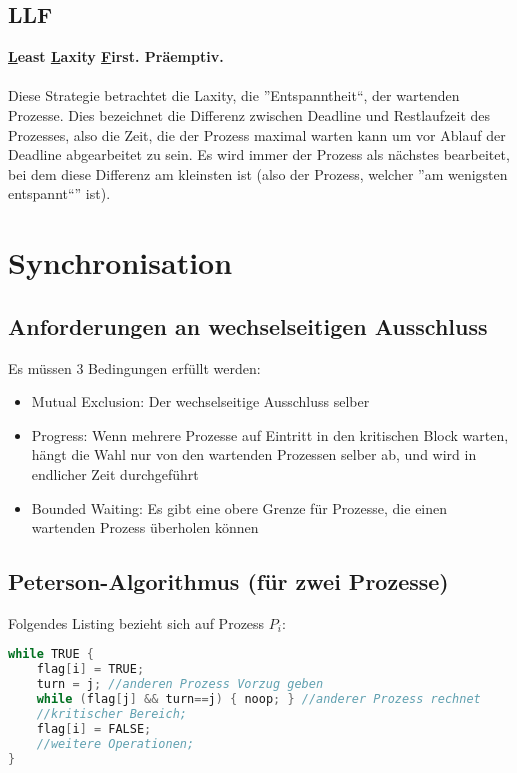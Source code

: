 \documentclass[11pt]{scrartcl}
\begin{document}
\subsection{LLF}
\textbf{\underline Least \underline Laxity \underline First. Präemptiv.}\\
\\
Diese Strategie betrachtet die Laxity, die ''Entspanntheit``, der wartenden Prozesse. Dies bezeichnet die Differenz zwischen Deadline und Restlaufzeit des Prozesses, also die Zeit, die der Prozess maximal warten kann um vor Ablauf der Deadline abgearbeitet zu sein. Es wird immer der Prozess als nächstes bearbeitet, bei dem diese Differenz am kleinsten ist (also der Prozess, welcher ''am wenigsten entspannt``'' ist).

\section{Synchronisation}
\subsection{Anforderungen an wechselseitigen Ausschluss}
Es müssen 3 Bedingungen erfüllt werden:

\begin{itemize}
\item{Mutual Exclusion: Der wechselseitige Ausschluss selber}
\item{Progress: Wenn mehrere Prozesse auf Eintritt in den kritischen Block warten, hängt die Wahl nur von den wartenden Prozessen selber ab, und wird in endlicher Zeit durchgeführt}
\item{Bounded Waiting: Es gibt eine obere Grenze für Prozesse, die einen wartenden Prozess überholen können}
\end{itemize}

\subsection{Peterson-Algorithmus (für zwei Prozesse)}
Folgendes Listing bezieht sich auf Prozess $P_i$:
\begin{lstlisting}[language=C]
while TRUE {
	flag[i] = TRUE;
	turn = j; //anderen Prozess Vorzug geben
	while (flag[j] && turn==j) { noop; } //anderer Prozess rechnet
	//kritischer Bereich;
	flag[i] = FALSE;
	//weitere Operationen;
}
\end{lstlisting}
\end{document}
